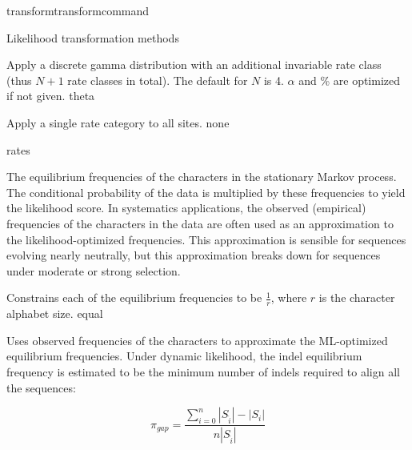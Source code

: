 \begin{command}{transform}{transformcommand}
\begin{arguments}
\begin{argumentgroup}{Likelihood transformation methods}
{\begin{description}
                        {Apply a discrete gamma distribution with an additional
                        invariable rate class (thus $N+1$ rate classes in total).
                        The default for $N$ is 4. $\alpha$ and \% are optimized if
                        not given.}
                        {theta}

                        {Apply a single rate category to all sites.}
                        {none}

                \end{description}}
                {rates}

                    {The equilibrium frequencies of the characters in the stationary
                    Markov process. The conditional probability of the data is
                    multiplied by these frequencies to yield the likelihood score.
                    In systematics applications, the observed (empirical)
                    frequencies of the characters in the data are often used as an
                    approximation to the likelihood-optimized frequencies. This
                    approximation is sensible for sequences evolving nearly
                    neutrally, but this approximation breaks down for sequences
                    under moderate or strong selection.

                    \begin{description}

                            {Constrains each of the equilibrium frequencies to be
                            $\frac{1}{r}$, where $r$ is the character alphabet size.}
                            {equal}

                            {Uses observed frequencies of the characters to
                            approximate the ML-optimized equilibrium
                            frequencies.  Under dynamic likelihood, the indel
                            equilibrium frequency is estimated to be the minimum
                            number of indels required to align all the
                            sequences: 
                            
                         
                            \begin{equation*}
                            \pi_{gap} = \frac{\sum_{i=0}^n
                            |S_{\hat{i}}| - |S_i|}{n |S_{\hat{i}}|}
                            \end{equation*}
                            
}
\end{description}}
\end{argumentgroup}
\end{arguments}
\end{command}
